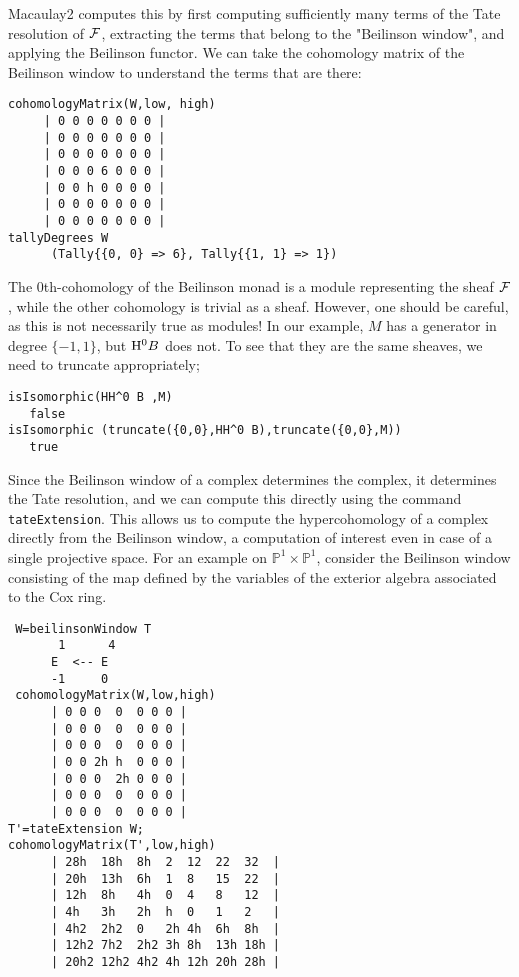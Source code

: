 \documentclass[twoside,12pt, leqno]{amsart}
\def\P{{\mathbb P}}
\begin{document}
Macaulay2 computes this by first computing sufficiently many terms of the Tate resolution
of ${\mathcal F}$, extracting  the terms
that belong to the "Beilinson window", and  applying the Beilinson functor.
We can take the cohomology matrix of the Beilinson window to understand
the terms that are there:
{\small
\begin{verbatim}
cohomologyMatrix(W,low, high)
     | 0 0 0 0 0 0 0 |
     | 0 0 0 0 0 0 0 |
     | 0 0 0 0 0 0 0 |
     | 0 0 0 6 0 0 0 |
     | 0 0 h 0 0 0 0 |
     | 0 0 0 0 0 0 0 |
     | 0 0 0 0 0 0 0 |
tallyDegrees W
      (Tally{{0, 0} => 6}, Tally{{1, 1} => 1})
 \end{verbatim}}

The 0th-cohomology of the Beilinson monad is a module representing the sheaf ${\mathcal F}$,
while the other cohomology is trivial as a sheaf. However, one should be careful, 
as this is not necessarily true as modules!
 In our example, $M$ has a generator in degree $\{-1,1\}$, but ${\rm H}^0 B$ does not.
To see that they are the same sheaves, we need to truncate appropriately;
{\small
\begin{verbatim}
isIsomorphic(HH^0 B ,M)
   false
isIsomorphic (truncate({0,0},HH^0 B),truncate({0,0},M))
   true
\end{verbatim}}

Since the Beilinson window of a complex determines the complex, it determines the Tate resolution, 
and we can compute this directly using the command {\tt tateExtension}. This allows us to compute the hypercohomology of a complex directly from the Beilinson window, a computation of interest even in case of a single projective space. For an example on $\P^1\times \P^1$, consider the Beilinson window consisting of the map defined by the variables of the exterior algebra  associated to the Cox ring.
{\small \begin{verbatim}
 W=beilinsonWindow T
       1      4
      E  <-- E              
      -1     0
 cohomologyMatrix(W,low,high)
      | 0 0 0  0  0 0 0 |
      | 0 0 0  0  0 0 0 |
      | 0 0 0  0  0 0 0 |
      | 0 0 2h h  0 0 0 |
      | 0 0 0  2h 0 0 0 |
      | 0 0 0  0  0 0 0 |
      | 0 0 0  0  0 0 0 |
T'=tateExtension W; 
cohomologyMatrix(T',low,high) 
      | 28h  18h  8h  2  12  22  32  |
      | 20h  13h  6h  1  8   15  22  |
      | 12h  8h   4h  0  4   8   12  |
      | 4h   3h   2h  h  0   1   2   |
      | 4h2  2h2  0   2h 4h  6h  8h  |
      | 12h2 7h2  2h2 3h 8h  13h 18h |
      | 20h2 12h2 4h2 4h 12h 20h 28h |
\end{verbatim}}
\end{document}
